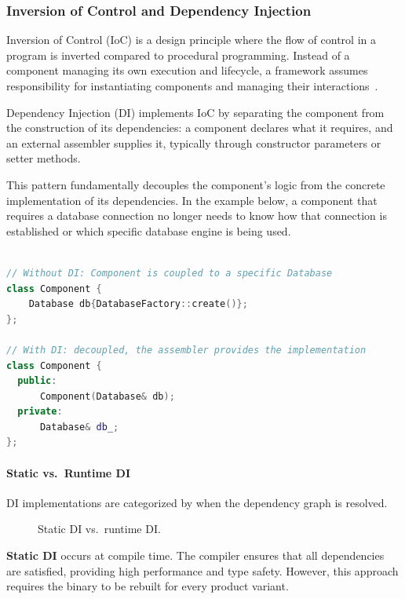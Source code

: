 \subsubsection{Inversion of Control and Dependency Injection}
\label{sec:di-ioc}

Inversion of Control (IoC) is a design principle where the flow of control in a program is inverted compared to procedural programming. Instead of a component managing its own execution and lifecycle, a framework assumes responsibility for instantiating components and managing their interactions~\cite{fowler2004di}. 

Dependency Injection (DI) implements IoC by separating the component from the construction of its dependencies: a component declares what it requires, and an external assembler supplies it, typically through constructor parameters or setter methods.

This pattern fundamentally decouples the component's logic from the concrete implementation of its dependencies. In the example below, a component that requires a database connection no longer needs to know how that connection is established or which specific database engine is being used.

\begin{lstlisting}[language=C++, aboveskip=10pt]

// Without DI: Component is coupled to a specific Database
class Component {
    Database db{DatabaseFactory::create()};
};

// With DI: decoupled, the assembler provides the implementation
class Component {
  public:
      Component(Database& db);
  private:
      Database& db_;
};
\end{lstlisting}

\paragraph{Static vs.\ Runtime DI}
DI implementations are categorized by when the dependency graph is resolved.

\begin{figure}[ht]
    \centering
    \resizebox{\textwidth}{!}{
        
    }
    \caption{Static DI vs.\ runtime DI.}
    \label{fig:static-vs-runtime-di}
\end{figure}

\textbf{Static DI} occurs at compile time. The compiler ensures that all dependencies are satisfied, providing high performance and type safety. However, this approach requires the binary to be rebuilt for every product variant.

